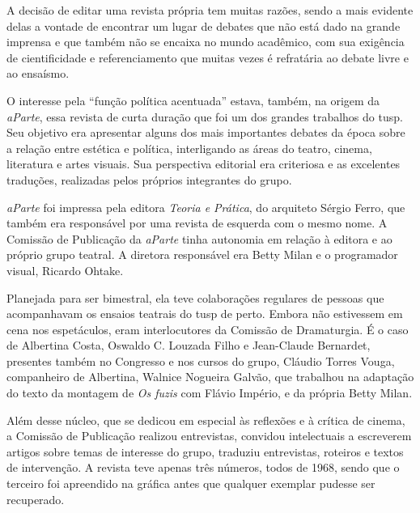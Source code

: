 A decisão de editar uma revista própria tem muitas razões, sendo a mais
evidente delas a vontade de encontrar um lugar de debates que não está
dado na grande imprensa e que também não se encaixa no mundo acadêmico,
com sua exigência de cientificidade e referenciamento que muitas vezes é
refratária ao debate livre e ao ensaísmo.

O interesse pela “função política acentuada” estava, também, na origem
da {\it aParte}, essa revista de curta duração que foi um dos grandes
trabalhos do {\sc tusp}. Seu objetivo era apresentar alguns dos mais
importantes debates da época sobre a relação entre estética e política,
interligando as áreas do teatro, cinema, literatura e artes visuais. Sua
perspectiva editorial era criteriosa e as excelentes traduções,
realizadas pelos próprios integrantes do grupo.

{\it aParte} foi impressa pela editora {\it Teoria e Prática}, do
arquiteto Sérgio Ferro, que também era responsável por uma revista de
esquerda com o mesmo nome. A Comissão de Publicação da {\it aParte}
tinha autonomia em relação à editora e ao próprio grupo teatral. A
diretora responsável era Betty Milan e o programador visual, Ricardo
Ohtake.

Planejada para ser bimestral, ela teve colaborações regulares de pessoas
que acompanhavam os ensaios teatrais do {\sc tusp} de perto. Embora não
estivessem em cena nos espetáculos, eram interlocutores da Comissão de
Dramaturgia. É o caso de Albertina Costa, Oswaldo C. Louzada Filho e
Jean-Claude Bernardet, presentes também no Congresso e nos cursos do
grupo, Cláudio Torres Vouga, companheiro de Albertina, Walnice Nogueira
Galvão, que trabalhou na adaptação do texto da montagem de {\it Os
fuzis} com Flávio Império, e da própria Betty Milan.

Além desse núcleo, que se dedicou em especial às reflexões e à crítica
de cinema, a Comissão de Publicação realizou entrevistas, convidou
intelectuais a escreverem artigos sobre temas de interesse do grupo,
traduziu entrevistas, roteiros e textos de intervenção. A revista teve
apenas três números, todos de 1968, sendo que o terceiro foi apreendido
na gráfica antes que qualquer exemplar pudesse ser recuperado.


